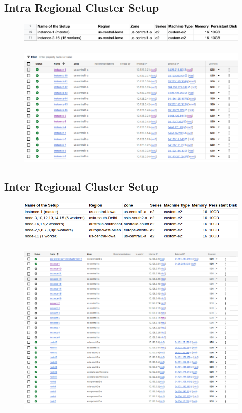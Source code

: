 \documentclass{article}
\begin{document}
\subsection{Intra Regional Cluster Setup}
\begin{figure}[h]
    \includegraphics[width=.90\textwidth]{intra.png}
\\[\smallskipamount]
\\[\smallskipamount]
    \includegraphics[width=.90\textwidth]{lightCluster.intraRegional.png}
\end{figure}

\subsection{Inter Regional Cluster Setup}
\begin{figure}[h]
    \includegraphics[width=.90\textwidth]{Setup Light Cluster (Inter Regional).png}
\\[\smallskipamount]
\\[\smallskipamount]
    \includegraphics[width=.90\textwidth]{lightCluster.interRegional.png}
\end{figure}
\newpage
\end{document}
